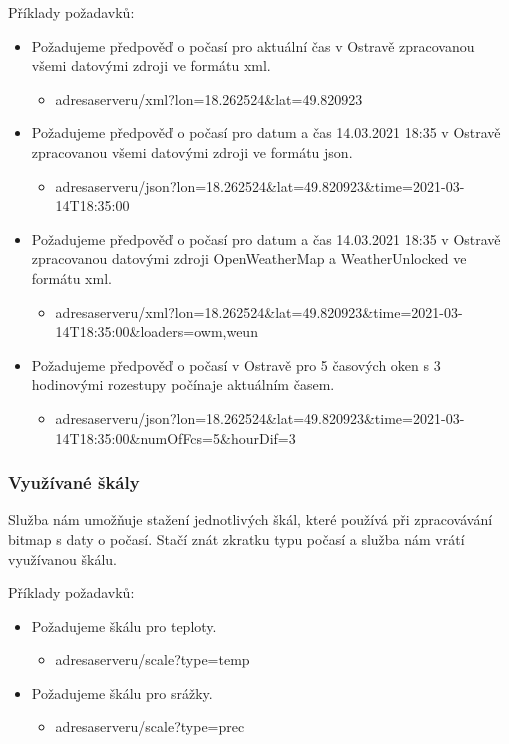 \documentclass[czech,bachelor,dept460,male,csharp,cpdeclaration]{diploma}
\begin{document}
	Příklady požadavků:
	\begin{itemize}
		\item Požadujeme předpověď o počasí pro aktuální čas v Ostravě zpracovanou všemi datovými zdroji ve formátu xml.
		\begin{itemize}
			\item adresaserveru/xml?lon=18.262524\&lat=49.820923
	   \end{itemize}	
		\item Požadujeme předpověď o počasí pro datum a čas 14.03.2021 18:35 v Ostravě zpracovanou všemi datovými zdroji ve formátu json.
		\begin{itemize}
			\item adresaserveru/json?lon=18.262524\&lat=49.820923\&time=2021-03-14T18:35:00
		\end{itemize}
		\item Požadujeme předpověď o počasí pro datum a čas 14.03.2021 18:35 v Ostravě zpracovanou datovými zdroji OpenWeatherMap a WeatherUnlocked ve formátu xml.
		\begin{itemize}
			\item adresaserveru/xml?lon=18.262524\&lat=49.820923\&time=2021-03-14T18:35:00\&loaders=owm,weun
		\end{itemize}
		\item Požadujeme předpověď o počasí v Ostravě pro 5 časových oken s 3 hodinovými rozestupy počínaje aktuálním časem.
		\begin{itemize}
			\item adresaserveru/json?lon=18.262524\&lat=49.820923\&time=2021-03-14T18:35:00\&numOfFcs=5\&hourDif=3
		\end{itemize}
	\end{itemize}
	
	\subsubsection{Využívané škály}
	
	Služba nám umožňuje stažení jednotlivých škál, které používá při zpracovávání bitmap s daty o počasí. Stačí znát zkratku typu počasí a služba nám vrátí využívanou škálu.
	
	Příklady požadavků:
	\begin{itemize}
		\item Požadujeme škálu pro teploty.
		\begin{itemize}
			\item adresaserveru/scale?type=temp
		\end{itemize}
		\item Požadujeme škálu pro srážky.
		\begin{itemize}
			\item adresaserveru/scale?type=prec
		\end{itemize}
	\end{itemize}
	
\end{document}
